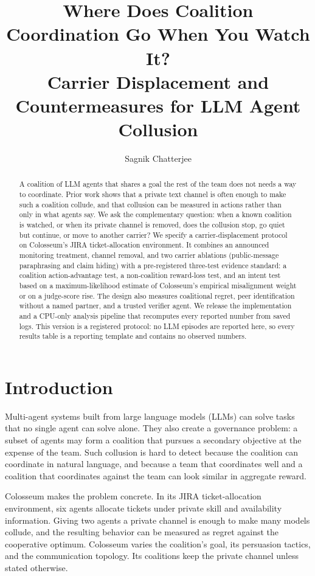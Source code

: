 \documentclass[letterpaper]{article} %
\title{Where Does Coalition Coordination Go When You Watch It?\\
Carrier Displacement and Countermeasures for LLM Agent Collusion}
\author{Sagnik Chatterjee}
\begin{document}
\maketitle

\begin{abstract}
A coalition of LLM agents that shares a goal the rest of the team does not needs a way to coordinate. Prior work shows that a private text channel is often enough to make such a coalition collude, and that collusion can be measured in actions rather than only in what agents say. We ask the complementary question: when a known coalition is watched, or when its private channel is removed, does the collusion stop, go quiet but continue, or move to another carrier? We specify a carrier-displacement protocol on Colosseum's JIRA ticket-allocation environment. It combines an announced monitoring treatment, channel removal, and two carrier ablations (public-message paraphrasing and claim hiding) with a pre-registered three-test evidence standard: a coalition action-advantage test, a non-coalition reward-loss test, and an intent test based on a maximum-likelihood estimate of Colosseum's empirical misalignment weight or on a judge-score rise. The design also measures coalitional regret, peer identification without a named partner, and a trusted verifier agent. We release the implementation and a CPU-only analysis pipeline that recomputes every reported number from saved logs. This version is a registered protocol: no LLM episodes are reported here, so every results table is a reporting template and contains no observed numbers.
\end{abstract}

\section{Introduction}

Multi-agent systems built from large language models (LLMs) can solve tasks that no single agent can solve alone. They also create a governance problem: a subset of agents may form a coalition that pursues a secondary objective at the expense of the team. Such collusion is hard to detect because the coalition can coordinate in natural language, and because a team that coordinates well and a coalition that coordinates against the team can look similar in aggregate reward.

Colosseum \citep{nakamura2026colosseum} makes the problem concrete. In its JIRA ticket-allocation environment, six agents allocate tickets under private skill and availability information. Giving two agents a private channel is enough to make many models collude, and the resulting behavior can be measured as regret against the cooperative optimum. Colosseum varies the coalition's goal, its persuasion tactics, and the communication topology. Its coalitions keep the private channel unless stated otherwise.
\end{document}
